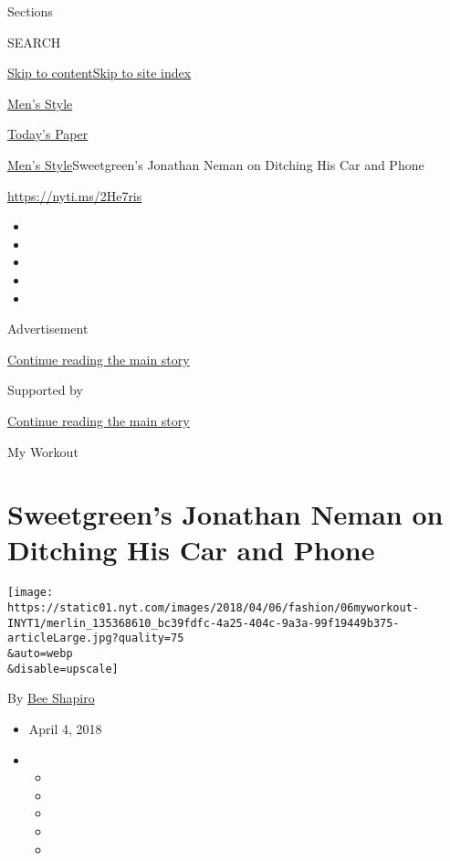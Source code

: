 Sections

SEARCH

\protect\hyperlink{site-content}{Skip to
content}\protect\hyperlink{site-index}{Skip to site index}

\href{https://www.nytimes.com/section/fashion/mens-style}{Men's Style}

\href{https://myaccount.nytimes.com/auth/login?response_type=cookie\&client_id=vi}{}

\href{https://www.nytimes.com/section/todayspaper}{Today's Paper}

\href{/section/fashion/mens-style}{Men's Style}\textbar{}Sweetgreen's
Jonathan Neman on Ditching His Car and Phone

\href{https://nyti.ms/2He7ris}{https://nyti.ms/2He7ris}

\begin{itemize}
\item
\item
\item
\item
\item
\end{itemize}

Advertisement

\protect\hyperlink{after-top}{Continue reading the main story}

Supported by

\protect\hyperlink{after-sponsor}{Continue reading the main story}

My Workout

\hypertarget{sweetgreens-jonathan-neman-on-ditching-his-car-and-phone}{%
\section{Sweetgreen's Jonathan Neman on Ditching His Car and
Phone}\label{sweetgreens-jonathan-neman-on-ditching-his-car-and-phone}}

\texttt{[image: https://static01.nyt.com/images/2018/04/06/fashion/06myworkout-INYT1/merlin\_135368610\_bc39fdfc-4a25-404c-9a3a-99f19449b375-articleLarge.jpg?quality=75\\\&auto=webp\\\&disable=upscale]}

By \href{https://www.nytimes.com/by/bee-shapiro}{Bee Shapiro}

\begin{itemize}
\item
  April 4, 2018
\item
  \begin{itemize}
  \item
  \item
  \item
  \item
  \item
  \end{itemize}
\end{itemize}

